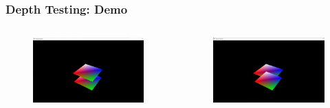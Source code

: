 \begin{frame}
\frametitle{Depth Testing: Demo}

\begin{columns}


\begin{figure}[ht]
    \centering
    \includegraphics[scale=0.14]{images/SlidesDepthTesting/DepthTesting.png}
\end{figure}


\begin{figure}[ht]
    \centering
    \includegraphics[scale=0.14]{images/SlidesDepthTesting/NoDepthTesting.png}
\end{figure}

\end{columns}

\end{frame}

